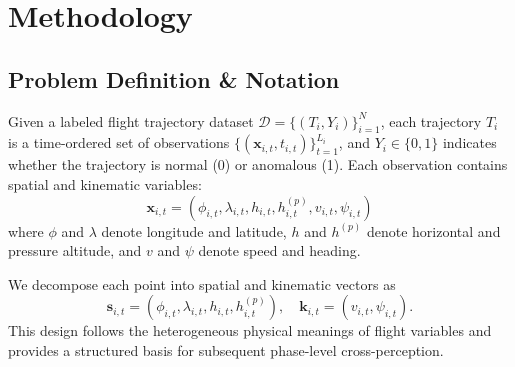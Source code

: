 \documentclass[iicol,pdflatex,sn-basic,Numbered]{sn-jnl}%
\theoremstyle{thmstyleone}%
\theoremstyle{thmstyletwo}%
\theoremstyle{thmstylethree}%
\begin{document}
\section{Methodology}\label{sec:methodology}

\subsection{Problem Definition \& Notation}

Given a labeled flight trajectory dataset $\mathcal{D} = \{(T_i, Y_i)\}_{i=1}^N$, each trajectory $T_i$ is a time-ordered set of observations $\{(\mathbf{x}_{i,t}, t_{i,t})\}_{t=1}^{L_i}$, and $Y_i \in \{0,1\}$ indicates whether the trajectory is normal (0) or anomalous (1).
Each observation contains spatial and kinematic variables:
\begin{equation}
\mathbf{x}_{i,t} = (\phi_{i,t}, \lambda_{i,t}, h_{i,t}, h^{(p)}_{i,t}, v_{i,t}, \psi_{i,t})
\end{equation}
where $\phi$ and $\lambda$ denote longitude and latitude, $h$ and $h^{(p)}$ denote horizontal and pressure altitude, and $v$ and $\psi$ denote speed and heading.

We decompose each point into spatial and kinematic vectors as
\begin{equation}
\label{eq:decomposition}
\mathbf{s}_{i,t} = (\phi_{i,t}, \lambda_{i,t}, h_{i,t}, h^{(p)}_{i,t}), \quad \mathbf{k}_{i,t} = (v_{i,t}, \psi_{i,t}).
\end{equation}
This design follows the heterogeneous physical meanings of flight variables and provides a structured basis for subsequent phase-level cross-perception.
\end{document}
